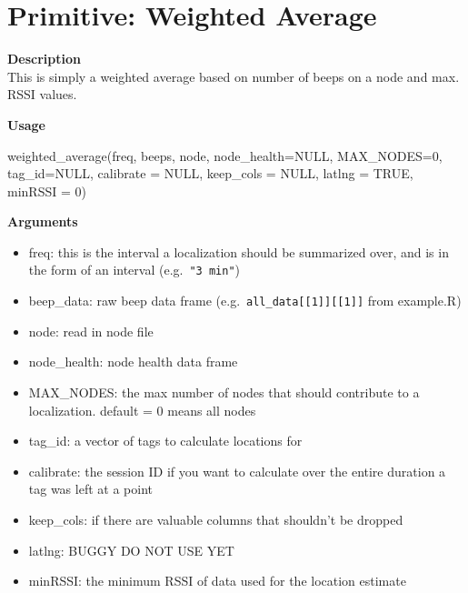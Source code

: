 \documentclass[
]{book}
\newenvironment{Shaded}{\begin{snugshade}}{\end{snugshade}}
\newcommand{\AttributeTok}[1]{\textcolor[rgb]{0.77,0.63,0.00}{#1}}
\newcommand{\ConstantTok}[1]{\textcolor[rgb]{0.00,0.00,0.00}{#1}}
\newcommand{\DecValTok}[1]{\textcolor[rgb]{0.00,0.00,0.81}{#1}}
\newcommand{\FunctionTok}[1]{\textcolor[rgb]{0.00,0.00,0.00}{#1}}
\newcommand{\NormalTok}[1]{#1}
\providecommand{\tightlist}{%
  \setlength{\itemsep}{0pt}\setlength{\parskip}{0pt}}
\begin{document}
\hypertarget{primitive-weighted-average}{%
\section{Primitive: Weighted Average}\label{primitive-weighted-average}}

\textbf{Description}\\
This is simply a weighted average based on number of beeps on a node and max. RSSI values.

\textbf{Usage}

\begin{Shaded}
\begin{Highlighting}[]
\FunctionTok{weighted\_average}\NormalTok{(freq, beeps, node, }\AttributeTok{node\_health=}\ConstantTok{NULL}\NormalTok{, }\AttributeTok{MAX\_NODES=}\DecValTok{0}\NormalTok{, }\AttributeTok{tag\_id=}\ConstantTok{NULL}\NormalTok{, }\AttributeTok{calibrate =} \ConstantTok{NULL}\NormalTok{, }\AttributeTok{keep\_cols =} \ConstantTok{NULL}\NormalTok{, }\AttributeTok{latlng =} \ConstantTok{TRUE}\NormalTok{, }\AttributeTok{minRSSI =} \DecValTok{0}\NormalTok{)}
\end{Highlighting}
\end{Shaded}

\textbf{Arguments}

\begin{itemize}
\tightlist
\item
  freq: this is the interval a localization should be summarized over, and is in the form of an interval (e.g.~\texttt{"3\ min"})\\
\item
  beep\_data: raw beep data frame (e.g.~\texttt{all\_data{[}{[}1{]}{]}{[}{[}1{]}{]}} from example.R)\\
\item
  node: read in node file\\
\item
  node\_health: node health data frame
\item
  MAX\_NODES: the max number of nodes that should contribute to a localization. default = 0 means all nodes
\item
  tag\_id: a vector of tags to calculate locations for
\item
  calibrate: the session ID if you want to calculate over the entire duration a tag was left at a point
\item
  keep\_cols: if there are valuable columns that shouldn't be dropped
\item
  latlng: BUGGY DO NOT USE YET
\item
  minRSSI: the minimum RSSI of data used for the location estimate
\end{itemize}
\end{document}
